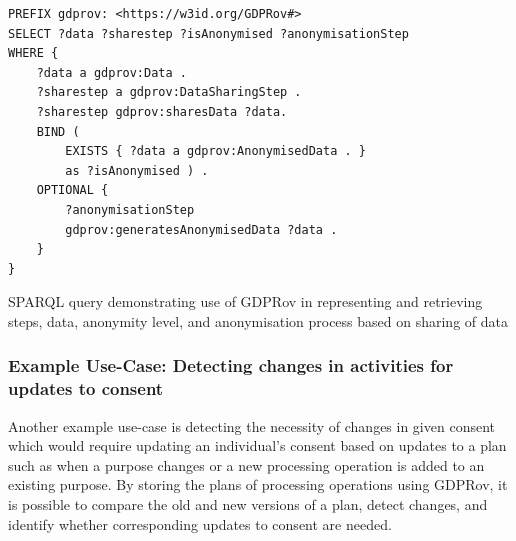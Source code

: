 \begin{listing}
\begin{verbatim}
PREFIX gdprov: <https://w3id.org/GDPRov#>
SELECT ?data ?sharestep ?isAnonymised ?anonymisationStep
WHERE {
    ?data a gdprov:Data .
    ?sharestep a gdprov:DataSharingStep .
    ?sharestep gdprov:sharesData ?data. 
    BIND (
        EXISTS { ?data a gdprov:AnonymisedData . }
        as ?isAnonymised ) .
    OPTIONAL {
        ?anonymisationStep
        gdprov:generatesAnonymisedData ?data .
    }
}
\end{verbatim}
\label{listing:vocabs:gdprov-query}
\caption{SPARQL query demonstrating use of GDPRov in representing and retrieving steps, data, anonymity level, and anonymisation process based on sharing of data \cite{pandit_modelling_2017}}
\end{listing}

\subsubsection{Example Use-Case: Detecting changes in activities for updates to consent}
Another example use-case is detecting the necessity of changes in given consent which would require updating an individual's consent based on updates to a plan such as when a purpose changes or a new processing operation is added to an existing purpose. By storing the plans of processing operations using GDPRov, it is possible to compare the old and new versions of a plan, detect changes, and identify whether corresponding updates to consent are needed. 

